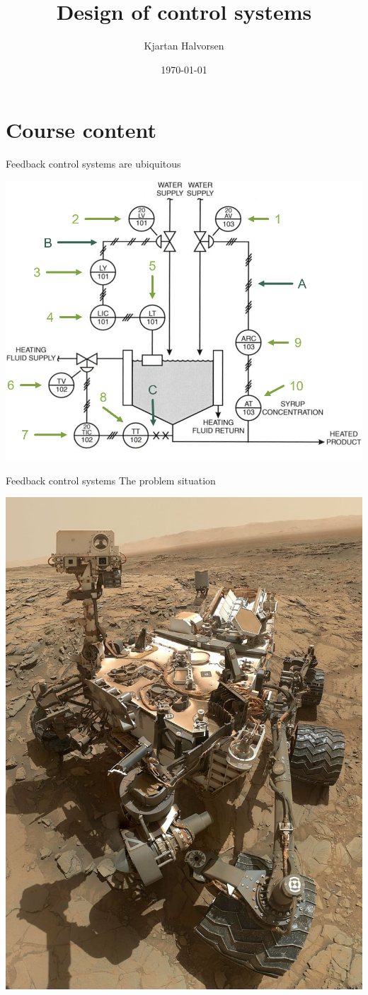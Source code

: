 \documentclass[presentation,aspectratio=169, usenames, dvipsnames]{beamer}
\author{Kjartan Halvorsen}
\date{\today}
\title{Design of control systems}
\begin{document}
\maketitle

\section{Course content}
\label{sec:orgd1eaf3e}

\begin{frame}[label={sec:org7b42b0b}]{Feedback control systems are ubiquitous}
\begin{center}
  \includegraphics[width=.6\linewidth]{../../figures/PnID-ex.png}
\end{center}
\end{frame}

\begin{frame}[label={sec:org2eee146}]{Feedback control systems}
The problem situation

\begin{center}
  \includegraphics[width=.34\linewidth]{../../figures/mars-rover-curiosity-vehicle-cosmos.jpg}
\end{center}
\end{frame}
\end{document}
